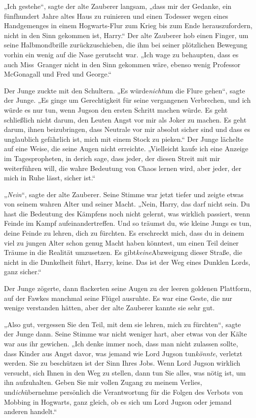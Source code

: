 {„Ich gestehe“, sagte der alte Zauberer langsam, „dass mir der Gedanke, ein fünfhundert Jahre altes Haus zu ruinieren und einen Todesser wegen eines Handgemenges in einem Hogwarts-Flur zum Krieg bis zum Ende herauszufordern, nicht in den Sinn gekommen ist, Harry.“ Der alte Zauberer hob einen Finger, um seine Halbmondbrille zurückzuschieben, die ihm bei seiner plötzlichen Bewegung vorhin ein wenig auf die Nase gerutscht war. „Ich wage zu behaupten, dass es auch Miss~Granger nicht in den Sinn gekommen wäre, ebenso wenig Professor McGonagall und Fred und George.“

Der Junge zuckte mit den Schultern. „Es würde\emph{nicht}um die Flure gehen“, sagte der Junge. „Es ginge um Gerechtigkeit für seine vergangenen Verbrechen, und ich würde es nur tun, wenn Jugson den ersten Schritt machen würde. Es geht schließlich nicht darum, den Leuten Angst vor mir als Joker zu machen. Es geht darum, ihnen beizubringen, dass Neutrale vor mir absolut sicher sind und dass es unglaublich gefährlich ist, mich mit einem Stock zu pieken.“ Der Junge lächelte auf eine Weise, die seine Augen nicht erreichte. „Vielleicht kaufe ich eine Anzeige im Tagespropheten, in derich sage, dass jeder, der diesen Streit mit mir weiterführen will, die wahre Bedeutung von Chaos lernen wird, aber jeder, der mich in Ruhe lässt, sicher ist.“

„\emph{Nein}“, sagte der alte Zauberer. Seine Stimme war jetzt tiefer und zeigte etwas von seinem wahren Alter und seiner Macht. „Nein, Harry, das darf nicht sein. Du hast die Bedeutung des Kämpfens noch nicht gelernt, was wirklich passiert, wenn Feinde im Kampf aufeinandertreffen. Und so träumst du, wie kleine Jungs es tun, deine Feinde zu lehren, dich zu fürchten. Es erschreckt mich, dass du in deinem viel zu jungen Alter schon genug Macht haben könntest, um einen Teil deiner Träume in die Realität umzusetzen. Es gibt\emph{keine}Abzweigung dieser Straße, die nicht in die Dunkelheit führt, Harry, keine. Das ist der Weg eines Dunklen Lords, ganz sicher.“

Der Junge zögerte, dann flackerten seine Augen zu der leeren goldenen Plattform, auf der Fawkes manchmal seine Flügel ausruhte. Es war eine Geste, die nur wenige verstanden hätten, aber der alte Zauberer kannte sie sehr gut.

„Also gut, vergessen Sie den Teil, mit dem sie lehren, mich zu fürchten“, sagte der Junge dann. Seine Stimme war nicht weniger hart, aber etwas von der Kälte war aus ihr gewichen. „Ich denke immer noch, dass man nicht zulassen sollte, dass Kinder aus Angst davor, was jemand wie Lord Jugson tun\emph{könnte}, verletzt werden. Sie zu beschützen ist der Sinn Ihres Jobs. Wenn Lord Jugson wirklich versucht, sich Ihnen in den Weg zu stellen, dann tun Sie alles, was nötig ist, um ihn aufzuhalten. Geben Sie mir vollen Zugang zu meinem Verlies, und\emph{ich}übernehme persönlich die Verantwortung für die Folgen des Verbots von Mobbing in Hogwarts, ganz gleich, ob es sich um Lord Jugson oder jemand anderen handelt.“

}
